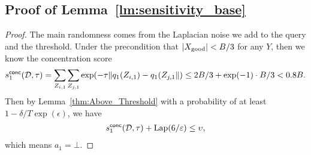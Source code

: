 \subsection{Proof of Lemma~\ref{lm:sensitivity_base}}
\sensitivitybase*
\begin{proof}
The main randomness comes from the Laplacian noise we add to the query and the threshold.
Under the precondition that $|X_{\mathrm{good}}|<B/3$ for any $Y$, 
then we know the concentration score 
\begin{align*}
    s^{\mathsf{conc}}_1(\mathcal{D},\tau)=\sum_{Z_{i,1}}\sum_{Z_{j,1}}\exp(-\tau \|q_1(Z_{i,1})-q_1(Z_{j,1}\|)
    \le 2B/3+\exp(-1)\cdot B/3<0.8B.
\end{align*}
Then by Lemma~\ref{thm:Above_Threshold} with a probability of at least $1-\delta/T\exp(\epsilon)$, we have
\begin{align*}
    s^{\mathsf{conc}}_1(\mathcal{D},\tau)+\mathrm{Lap}(6/\varepsilon)\le \upsilon,
\end{align*}
which means $a_1=\bot$.
\end{proof}



